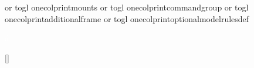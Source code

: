 {\begin{minipage}[t]{\textwidth}
{{		or togl {onecolprintmounts}
		or togl {onecolprintcommandgroup}
		or togl {onecolprintadditionalframe}
		or togl {onecolprintoptionalmodelrulesdef}
	}{%
		\vspace*{-5pt}%
		\iftoggle{onecolprintmodelrulesdef}{\strut\modelrulesdef{\unit@modelrulesdef}}{}%
		\iftoggle{onecolprintoptions}{%
			\expandafter\ifblank\expandafter{\unit@options}{%
				\strut\explicitoptionstwocols{\unit@explicitoptions}%
			}{%
				\strut\optionstwocols{\unit@options}%
			}%
		}{}%
		\iftoggle{onecolprintmounts}{\strut\mountstwocols{\unit@mounts}}{}%
		\iftoggle{onecolprintcommandgroup}{\strut\commandgrouptwocols{\unit@commandgroup}}{}%
		\iftoggle{onecolprintadditionalframe}{\strut\additionalframetwocols{\unit@additionalframe}}{}%
		\iftoggle{onecolprintoptionalmodelrulesdef}{\strut\optionalmodelrulesdef{\unit@optionalmodelrulesdef}}{}%
	}{}%
}{}%

\expandafter\ifblank\expandafter{\unit@endtext}{}{\unit@endtext}%

\expandafter\ifblank\expandafter{\unit@flavour}{}{\bigskip\begin{quote}
\small\center{\textit{\unit@flavour}}
\end{quote}}%

\vspace*{-3pt}%
\hfill{\verysmallfontsize\textcolor{white}{d}}%
\end{minipage}%
\vspace{12pt}%


%
\expandafter\dtbfillunitname\expandafter{\unit@name}%

\def\tempQRSname{}
\StrGobbleRight{\expandafter\expandafter\expandafter\@gobble\expandafter\string\unit@name}{1}[\tempQRSname]%
\expandafter\ifblank\expandafter{\unit@QRSname}{%
	\expandafter\ifundef\expandafter{\csname \tempQRSname QRS\endcsname}{\dtbfillunitQRSname{}}{\expandafter\dtbfillunitQRSname\expandafter{\csname \tempQRSname QRS\endcsname}}%
}{%
	\expandafter\dtbfillunitQRSname\expandafter{\unit@QRSname}%
}

}

